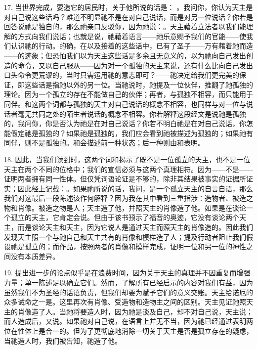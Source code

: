 17. 当世界完成，要造它的居民时，关于他所说的话是： 。我问你，你认为天主是对自己说这些话吗？难道不明显祂不是在对自己说话，而是对另一位说话？你若是回答说祂是独自的，那么祂亲口反驳你，因为祂说：。天主藉着立法者以我们能理解的方式向我们说话；也就是说，祂藉着语言——祂乐意赐予我们的官能——使我们认识祂的行动。的确，在以及接着的这些话中，已有了圣子——万有藉着祂而造——的迹象；但恐怕我们以为天主这些话是多余且无意义的，以为祂向自己发出创造的命令，又以自己服从——因为对一个孤独的天主来说，还有什么比向自己发出口头命令更荒谬的，当时只需运用祂的意志即可？——祂决定给我们更完美的保证，即这些话是指祂以外的另一位。当祂说时，祂提及一位伙伴，推翻了祂孤独的理论。因为一个孤立的存在不能做自己的伙伴；再者，与孤独不相容，而只能用于同伴。和这两个词都与孤独的天主对自己说话的概念不相容，也同样与对一位与说话者毫无共同之处的陌生者说话的概念不相容。你若解释这段经文是说祂是孤独的，我问你，你是否认为祂是在对自己说话？你若不明白祂是在对自己说话，你怎能假定祂是孤独的？如果祂是孤独的，我们应会看到祂被描述为孤独的；如果祂有同伴，则不是孤独的。和会描述前一种状态；后一种则由和表明。\par

18. 因此，当我们读到时，这两个词和揭示了既不是一位孤立的天主，也不是一位天主在两个不同的位格中；我们的宣信必须与这两个真理相符。因为——不是——证明两者拥有同一性体。但仅凭词语论证是不够的，除非其结果被事实的证据所证实；因此经上记载：。如果祂所说的话，我问，是一个孤立天主的自言自语，那么我们对这最后一段陈述该作何解释？因为我在其中看到三重指涉：造物者、被造之物和肖像。被造之物是人；天主造了他，并照天主的肖像造了他。如果是在谈论一个孤立的天主，它肯定会说。但由于该书预示了福音的奥迹，它没有谈论两个天主，而是谈论天主和天主，因为它说人是通过天主而照天主的肖像造的。因此我们发现天主照一个与祂自己和天主共有的肖像和模样造了人；提及行动者阻止我们假设祂是孤立的；而作品，按照两者的肖像和模样完成，证明一位和另一位的神性之间没有本质差异。\par

19. 提出进一步的论点似乎是在浪费时间，因为关于天主的真理并不因重复而增强力量；单一陈述足以确立它们。然而，了解所有已经启示的内容对我们有益，因为虽然我们不为圣经的话语负责，但我们却要为赋予它们的意义交账。天主给诺厄的众多诫命之一是。这里再次有肖像、受造物和造物主之间的区别。天主见证祂照天主的肖像造了人。当祂将要造人时，因为祂是谈及自己，却不对自己说，天主说；而人造成后，又说。如果祂对自己说，在语言上并无不当，因为祂已经通过表明两位在性体上是合一的。但为了更彻底地消除一切关于天主是否是孤立存在的疑虑，当祂造人时，我们被告知，祂造了他。\par

